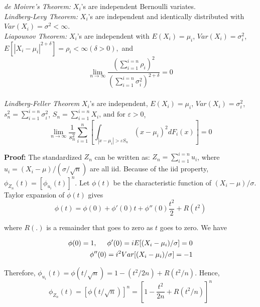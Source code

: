 \documentclass{article}
\begin{document}
\textit{de Moivre's Theorem:} \(X_i\)'s are independent Bernoulli variates.\\

\textit{Lindberg-Levy Theorem:} \(X_i\)'s are independent and identically distributed with \(Var(X_i)=\sigma^2<\infty\).\\

\textit{Liapounov Theorem:} \(X_i\)'s are independent with \(E(X_i)=\mu_i\), \(Var(X_i)=\sigma_i^2\), \(E[|X_i-\mu_i|^{2+\delta}]=\rho_i<\infty (\delta>0),\) and
\begin{equation*}
    \lim_{n \rightarrow \infty} \frac{(\sum_{i=1}^{i=n} \rho_i)^2}{(\sum_{i=1}^{i=n} \sigma_i^2)^{2+\delta}}=0
\end{equation*}\\

\textit{Lindberg-Feller Theorem} \(X_i\)'s are independent, \(E(X_i)=\mu_i\), \(Var(X_i)=\sigma_i^2\), \(s_n^2=\sum_{i=1}^{i=n}\sigma_i^2\), \(S_n=\sum_{i=1}^{i=n}X_i \text{, and for } \varepsilon>0\),
\begin{equation*}
    \lim_{n \rightarrow \infty} \frac{1}{s_n^2} \sum_{i=1}^{n} \left[ \int_{|x-\mu_i|>\varepsilon S_n} (x-\mu_i)^2 dF_i(x) \right]=0
\end{equation*}

\textbf{Proof:} The standardized \(Z_n\) can be written as: \(Z_n=\sum_{i=1}^{i=n}u_i\), where \(u_i=(X_i-\mu)/(\sigma/\sqrt{n})\) are all iid. Because of the iid property, \(\phi_{Z_n}(t)=[\phi_{u_i}(t)]^n\). Let \(\phi(t)\) be the characteristic function of \((X_i-\mu)/\sigma\). Taylor expansion of \(\phi(t)\) gives
\begin{equation*}
    \phi(t)=\phi(0)+\phi'(0)t+\phi''(0)\frac{t^2}{2}+R(t^2)
\end{equation*}

where \(R(.)\) is a remainder that goes to zero as \(t\) goes to zero. We have

\begin{equation*}
    \begin{split}
        \phi(0)=1, \hspace{0.5cm} \phi'(0)=iE[(X_i-\mu_i)/\sigma]=0\\
        \phi''(0)=i^2 Var[(X_i-\mu_i)/\sigma]=-1
    \end{split}
\end{equation*}

Therefore, \(\phi_{u_i}(t)=\phi(t/\sqrt{n})=1-(t^2/2n)+R(t^2/n)\). Hence,
\begin{equation*}
    \phi_{Z_n}(t)=[\phi(t/\sqrt{n})]^n=\left[1-\frac{t^2}{2n}+R(t^2/n) \right]^n
\end{equation*}
\end{document}
